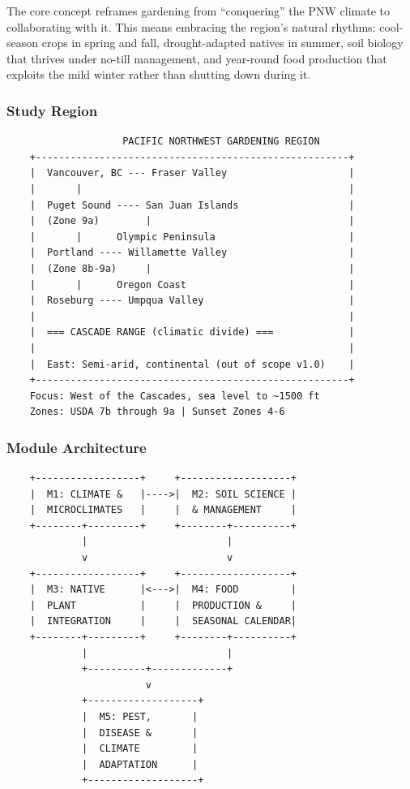\documentclass[11pt,letterpaper]{article}
\begin{document}
The core concept reframes gardening from ``conquering'' the PNW climate to collaborating with it. This means embracing the region's natural rhythms: cool-season crops in spring and fall, drought-adapted natives in summer, soil biology that thrives under no-till management, and year-round food production that exploits the mild winter rather than shutting down during it.

\subsubsection{Study Region}

\begin{asciibox}
\begin{verbatim}
                    PACIFIC NORTHWEST GARDENING REGION
    +------------------------------------------------------+
    |  Vancouver, BC --- Fraser Valley                     |
    |       |                                              |
    |  Puget Sound ---- San Juan Islands                   |
    |  (Zone 9a)        |                                  |
    |       |      Olympic Peninsula                       |
    |  Portland ---- Willamette Valley                     |
    |  (Zone 8b-9a)     |                                  |
    |       |      Oregon Coast                            |
    |  Roseburg ---- Umpqua Valley                         |
    |                                                      |
    |  === CASCADE RANGE (climatic divide) ===             |
    |                                                      |
    |  East: Semi-arid, continental (out of scope v1.0)    |
    +------------------------------------------------------+
    Focus: West of the Cascades, sea level to ~1500 ft
    Zones: USDA 7b through 9a | Sunset Zones 4-6
\end{verbatim}
\end{asciibox}

\subsubsection{Module Architecture}

\begin{asciibox}
\begin{verbatim}
    +------------------+     +-------------------+
    |  M1: CLIMATE &   |---->|  M2: SOIL SCIENCE |
    |  MICROCLIMATES   |     |  & MANAGEMENT     |
    +--------+---------+     +--------+----------+
             |                        |
             v                        v
    +------------------+     +-------------------+
    |  M3: NATIVE      |<--->|  M4: FOOD         |
    |  PLANT           |     |  PRODUCTION &     |
    |  INTEGRATION     |     |  SEASONAL CALENDAR|
    +--------+---------+     +--------+----------+
             |                        |
             +----------+-------------+
                        v
             +-------------------+
             |  M5: PEST,       |
             |  DISEASE &       |
             |  CLIMATE         |
             |  ADAPTATION      |
             +-------------------+
\end{verbatim}
\end{asciibox}
\end{document}
